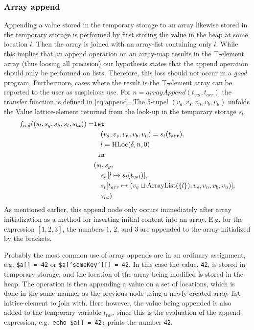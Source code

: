 \subsubsection{Array append}
Appending a value stored in the temporary storage to an array likewise stored in the temporary storage is performed by first storing the value in the heap at some location $l$. Then the array is joined with an array-list containing only $l$. While this implies that an append operation on an array-map results in the $\top$-element array (thus loosing all precision) our hypothesis states that the append operation should only be performed on lists. Therefore, this loss should not occur in a \emph{good} program. Furthermore, cases where the result is the $\top$-element array can be reported to the user as suspicious use. For $n = \mathit{arrayAppend}(t_{val},t_{arr})$ the transfer function is defined in \ref{eq:append}. The 5-tupel $(v_a, v_s, v_n, v_b, v_u)$ unfolds the Value lattice-element returned from the look-up in the temporary storage $s_t$.
\begin{align}
f_{n,\delta}((s_l, s_g, s_h, s_t, s_{ht})) = & \texttt{let } \notag\\
                                    & \quad (v_a,v_s,v_n,v_b,v_u) = s_t(t_{arr}), \notag\\
                                    & \quad l = \text{HLoc}(\delta, n, 0)\notag\\
                                    & \texttt{ in } \notag\\
                                    &(s_l,s_g,\notag\\
                                    &\quad s_h[l\mapsto s_t(t_{val})], \notag\\
                                    &\quad s_t[t_{arr} \mapsto (v_a \sqcup \text{ArrayList}(\{l\}),v_s, v_n, v_b, v_u)],\notag\\
                                    &\quad s_{ht}) \label{eq:append}
\end{align}
As mentioned earlier, this append node only occurs immediately after array initialization as a method for inserting initial content into an array. E.g. for the expression $[1,2,3]$, the numbers $1$, $2$, and $3$ are appended to the array initialized by the brackets.

Probably the most common use of array appends are in an ordinary assignment, e.g. \texttt{\$a[] = 42} or \texttt{\$a['someKey'][] = 42}. In this case the value, \texttt{42}, is stored in temporary storage, and the location of the array being modified is stored in the heap. The operation is then appending a value on a set of locations, which is done in the same manner as the previous node using a newly created array-list lattice-element to join with. Here however, the value being appended is also added to the temporary variable $t_{tar}$, since this is the evaluation of the append-expression, e.g.\ \texttt{echo \$a[] = 42;} prints the number \texttt{42}. 

